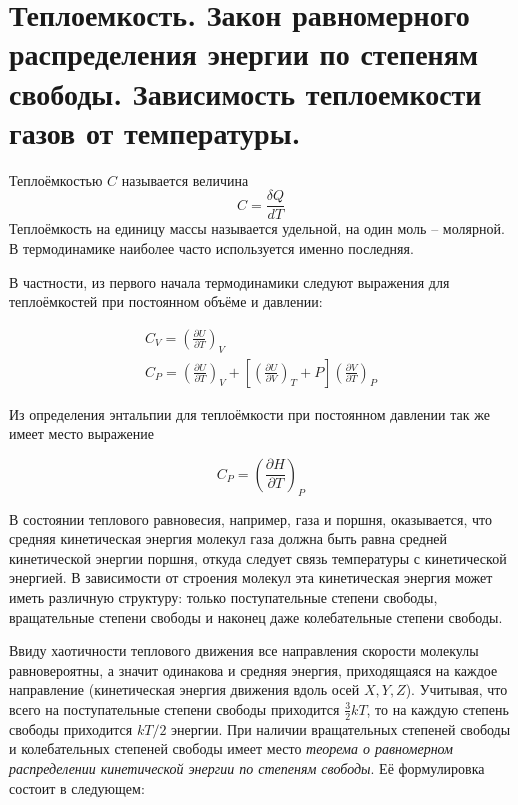 \section{Теплоемкость. Закон равномерного распределения энергии по степеням свободы. Зависимость теплоемкости газов от температуры.}

\begin{definition}
    Теплоёмкостью $C$ называется величина
    \begin{equation*}
        C = \frac{\delta Q}{dT}
    \end{equation*}
    Теплоёмкость на единицу массы называется удельной, на один моль -- молярной. В термодинамике наиболее часто используется именно последняя.
\end{definition}

В частности, из первого начала термодинамики следуют выражения для теплоёмкостей при постоянном объёме и давлении:

\begin{gather}
    C_V = \left( \frac{\partial U}{\partial T} \right)_V \\
    C_P = \left( \frac{\partial U}{\partial T} \right)_V + \left[ \left( \frac{\partial U}{\partial V} \right)_T + P \right] \left( \frac{\partial V}{\partial T} \right)_P
\end{gather}

Из определения энтальпии для теплоёмкости при постоянном давлении так же имеет место выражение

\begin{equation}
    C_P = \left( \frac{\partial H}{\partial T} \right)_P
\end{equation}

В состоянии теплового равновесия, например, газа и поршня, оказывается, что средняя кинетическая энергия молекул газа должна быть равна средней кинетической энергии поршня, откуда следует связь температуры с кинетической энергией. В зависимости от строения молекул эта кинетическая энергия может иметь различную структуру: только поступательные степени свободы, вращательные степени свободы и наконец даже колебательные степени свободы.

Ввиду хаотичности теплового движения все направления скорости молекулы равновероятны, а значит одинакова и средняя энергия, приходящаяся на каждое направление (кинетическая энергия движения вдоль осей $X, Y, Z$). Учитывая, что всего на поступательные степени свободы приходится $\frac{3}{2} k T$, то на каждую степень свободы приходится $k T / 2$ энергии. При наличии вращательных степеней свободы и колебательных степеней свободы имеет место \textit{теорема о равномерном распределении кинетической энергии по степеням свободы}. Её формулировка состоит в следующем:


